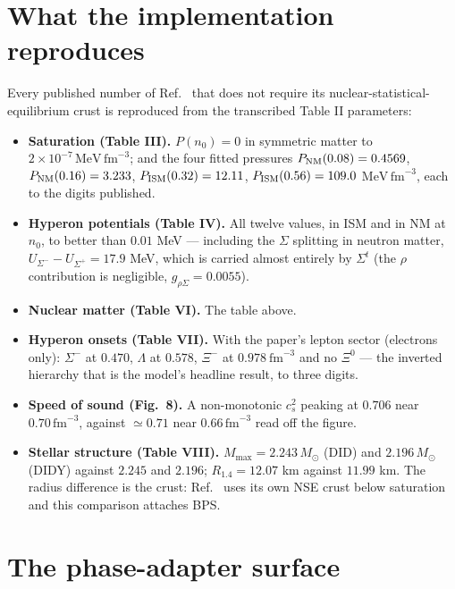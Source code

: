 \documentclass[aps,prc,onecolumn,superscriptaddress,nofootinbib,10pt]{revtex4-2}
\newcommand{\nzero}{n_0}
\newcommand{\Sigmat}{\Sigma^{t}}
\begin{document}
\section{What the implementation reproduces}
\label{sec:validation}

Every published number of Ref.~\cite{Frohaug2025} that does not require its
nuclear-statistical-equilibrium crust is reproduced from the transcribed
Table II parameters:
\begin{itemize}
\item \textbf{Saturation (Table III).} $P(\nzero) = 0$ in symmetric matter to
      $2\times10^{-7}\,\mathrm{MeV}\,\mathrm{fm}^{-3}$; and the four fitted
      pressures $P_{\rm NM}(0.08) = 0.4569$, $P_{\rm NM}(0.16) = 3.233$,
      $P_{\rm ISM}(0.32) = 12.11$, $P_{\rm ISM}(0.56) = 109.0$
      $\mathrm{MeV}\,\mathrm{fm}^{-3}$, each to the digits published.
\item \textbf{Hyperon potentials (Table IV).} All twelve values, in ISM and in
      NM at $\nzero$, to better than $0.01$ MeV --- including the $\Sigma$
      splitting in neutron matter, $U_{\Sigma^-} - U_{\Sigma^+} = 17.9$ MeV,
      which is carried almost entirely by $\Sigmat$ (the $\rho$ contribution
      is negligible, $g_{\rho\Sigma} = 0.0055$).
\item \textbf{Nuclear matter (Table VI).} The table above.
\item \textbf{Hyperon onsets (Table VII).} With the paper's lepton sector
      (electrons only): $\Sigma^-$ at $0.470$, $\Lambda$ at $0.578$, $\Xi^-$
      at $0.978\ \mathrm{fm}^{-3}$ and no $\Xi^0$ --- the inverted hierarchy
      that is the model's headline result, to three digits.
\item \textbf{Speed of sound (Fig.~8).} A non-monotonic $c_s^2$ peaking at
      $0.706$ near $0.70\,\mathrm{fm}^{-3}$, against $\simeq 0.71$ near
      $0.66\,\mathrm{fm}^{-3}$ read off the figure.
\item \textbf{Stellar structure (Table VIII).} $M_{\max} = 2.243\,M_\odot$
      (DID) and $2.196\,M_\odot$ (DIDY) against $2.245$ and $2.196$;
      $R_{1.4} = 12.07$ km against $11.99$ km. The radius difference is the
      crust: Ref.~\cite{Frohaug2025} uses its own NSE crust below saturation
      and this comparison attaches BPS.
\end{itemize}

\section{The phase-adapter surface}
\label{sec:adapter}
\end{document}
